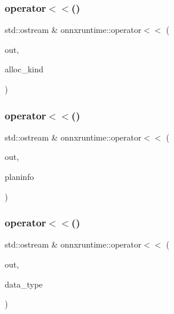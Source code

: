 \mbox{\label{namespaceonnxruntime_a37b22921c708227212dd09d25521ff93}} 
\subsubsection{\texorpdfstring{operator$<$$<$()}{operator<<()}\hspace{0.1cm}{\footnotesize\ttfamily [1/5]}}
{\footnotesize\ttfamily std\+::ostream \& onnxruntime\+::operator$<$$<$ (\begin{DoxyParamCaption}\item[{std\+::ostream \&}]{out,  }\item[{\mbox{\hyperlink{namespaceonnxruntime_a96c3d8f2cb52b6f3e388d72f37e6fc7c}{Alloc\+Kind}}}]{alloc\+\_\+kind }\end{DoxyParamCaption})}

\mbox{\label{namespaceonnxruntime_a310735a2d99a62a07608f3cc75b53f2a}} 
\subsubsection{\texorpdfstring{operator$<$$<$()}{operator<<()}\hspace{0.1cm}{\footnotesize\ttfamily [2/5]}}
{\footnotesize\ttfamily std\+::ostream \& onnxruntime\+::operator$<$$<$ (\begin{DoxyParamCaption}\item[{std\+::ostream \&}]{out,  }\item[{std\+::pair$<$ const \mbox{\hyperlink{structonnxruntime_1_1SequentialExecutionPlan}{Sequential\+Execution\+Plan}} $\ast$, const \mbox{\hyperlink{classonnxruntime_1_1SessionState}{Session\+State}} $\ast$$>$}]{planinfo }\end{DoxyParamCaption})}

\mbox{\label{namespaceonnxruntime_a7e5dbb4b07ee5e49ad3dcdd97c926a5b}} 
\subsubsection{\texorpdfstring{operator$<$$<$()}{operator<<()}\hspace{0.1cm}{\footnotesize\ttfamily [3/5]}}
{\footnotesize\ttfamily std\+::ostream \& onnxruntime\+::operator$<$$<$ (\begin{DoxyParamCaption}\item[{std\+::ostream \&}]{out,  }\item[{\mbox{\hyperlink{namespaceonnxruntime_ad77d0a6e838ec7da5dc35fed5ee66b49}{M\+L\+Data\+Type}}}]{data\+\_\+type }\end{DoxyParamCaption})}

